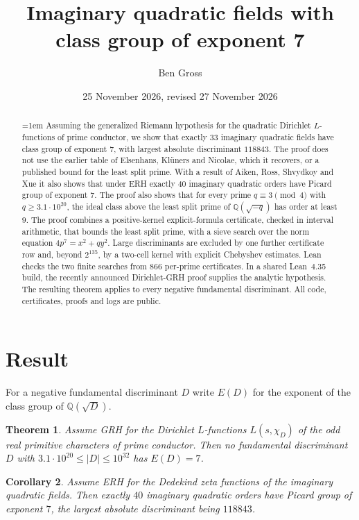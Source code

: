 \documentclass[11pt]{amsart}
\title[Class groups of exponent 7]{Imaginary quadratic fields with class group of exponent 7}
\author{Ben Gross}
\date{25 November 2026, revised 27 November 2026}
\newtheorem{theorem}{Theorem}
\newtheorem{corollary}[theorem]{Corollary}
\theoremstyle{remark}
\newcommand{\Q}{\mathbb{Q}}
\begin{document}
\begin{abstract}\emergencystretch=1em
Assuming the generalized Riemann hypothesis for the quadratic Dirichlet $L$-functions of prime conductor, we show that exactly $33$ imaginary quadratic fields have class group of exponent $7$, with largest absolute discriminant $118843$. The proof does not use the earlier table of Elsenhans, Kl\"uners and Nicolae, which it recovers, or a published bound for the least split prime. With a result of Aiken, Ross, Shvydkoy and Xue it also shows that under ERH exactly $40$ imaginary quadratic orders have Picard group of exponent $7$. The proof also shows that for every prime $q\equiv3\pmod4$ with $q\ge3.1\cdot10^{20}$, the ideal class above the least split prime of $\Q(\sqrt{-q})$ has order at least $9$. The proof combines a positive-kernel explicit-formula certificate, checked in interval arithmetic, that bounds the least split prime, with a sieve search over the norm equation $4p^7=x^2+qy^2$. Large discriminants are excluded by one further certificate row and, beyond $2^{135}$, by a two-cell kernel with explicit Chebyshev estimates. Lean checks the two finite searches from $866$ per-prime certificates. In a shared Lean~4.35 build, the recently announced Dirichlet-GRH proof supplies the analytic hypothesis. The resulting theorem applies to every negative fundamental discriminant. All code, certificates, proofs and logs are public.
\end{abstract}

\maketitle

\section{Result}

For a negative fundamental discriminant $D$ write $E(D)$ for the exponent of the class group of $\Q(\sqrt D)$.

\begin{theorem}\label{thm:A}
Assume GRH for the Dirichlet $L$-functions $L(s,\chi_D)$ of the odd real primitive characters of prime conductor. Then no fundamental discriminant $D$ with $3.1\cdot10^{20}\le|D|\le10^{32}$ has $E(D)=7$.
\end{theorem}

\begin{corollary}\label{cor:B}
Assume ERH for the Dedekind zeta functions of the imaginary quadratic fields. Then exactly $40$ imaginary quadratic orders have Picard group of exponent $7$, the largest absolute discriminant being $118843$.
\end{corollary}
\end{document}
